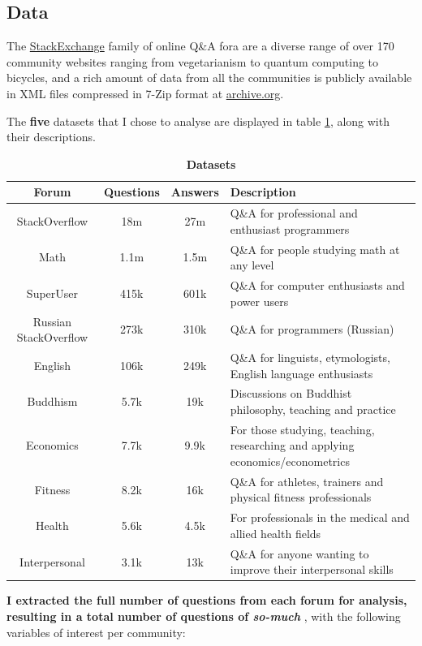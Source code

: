 \documentclass[11pt,preprint, authoryear]{article}
\numberwithin{equation}{section}
\numberwithin{figure}{section}
\begin{document}
\subsection{\texorpdfstring{Data \label{Data}}{Data }}\label{data}

The \href{https://stackexchange.com/sites\#traffic}{StackExchange}
family of online Q\&A fora are a diverse range of over 170 community
websites ranging from vegetarianism to quantum computing to bicycles,
and a rich amount of data from all the communities is publicly available
in XML files compressed in 7-Zip format at
\href{http://archive.org/download/stackexchange}{archive.org}.

The \textbf{five} datasets that I chose to analyse are displayed in
table \ref{tab:fora}, along with their descriptions.

\footnotesize

\begin{longtable} {@{} cccp{9cm} @{}}
\caption{\textbf{Datasets}}
\label{tab:fora}\\ \hline \hline
Forum & Questions & Answers & Description \\ 
\hline
StackOverflow & 18m & 27m & Q\&A for professional and enthusiast programmers \\
Math & 1.1m & 1.5m & Q\&A for people studying math at any level \\
SuperUser & 415k & 601k & Q\&A for computer enthusiasts and power users \\ 
Russian StackOverflow & 273k & 310k & Q\&A for programmers (Russian) \\ 
English & 106k & 249k & Q\&A for linguists, etymologists, English language enthusiasts \\ 
Buddhism & 5.7k & 19k & Discussions on Buddhist philosophy, teaching and practice \\
Economics & 7.7k & 9.9k & For those studying, teaching, researching and applying economics/econometrics \\
Fitness & 8.2k & 16k & Q\&A for athletes, trainers and physical fitness professionals \\ 
Health & 5.6k & 4.5k & For professionals in the medical and allied health fields \\ 
Interpersonal & 3.1k & 13k & Q\&A for anyone wanting to improve their interpersonal skills \\ 
\hline \hline
\end{longtable}

\normalsize

\textbf{I extracted the full number of questions from each forum for
analysis, resulting in a total number of questions of \emph{so-much} },
with the following variables of interest per community:
\end{document}
